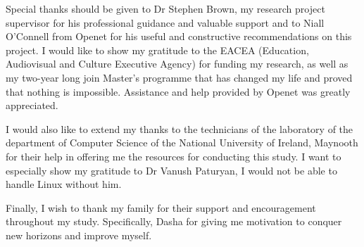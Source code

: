 

\begin{acknowledgements}      %

Special thanks should be given to Dr Stephen Brown, my research project supervisor for his professional guidance and valuable support and to Niall O'Connell from Openet for his useful and constructive recommendations on this project. I would like to show my gratitude to the EACEA (Education, Audiovisual and Culture Executive Agency) for funding my research, as well as my two-year long join Master's programme that has changed my life and proved that nothing is impossible. Assistance and help provided by Openet was greatly appreciated.

I would also like to extend my thanks to the technicians of the laboratory of the department of Computer Science of the National University of Ireland, Maynooth for their help in offering me the resources for conducting this study. I want to especially show my gratitude to Dr Vanush Paturyan, I would not be able to handle Linux without him.

Finally, I wish to thank my family for their support and encouragement throughout my study. Specifically, Dasha for giving me motivation to conquer new horizons and improve myself.
\end{acknowledgements}



